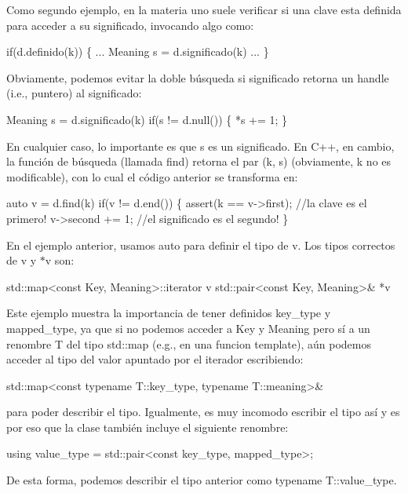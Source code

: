 Como segundo ejemplo, en la materia uno suele verificar si una clave esta definida para acceder a su significado, invocando algo como\+: 
\begin{DoxyCode}
if(d.definido(k)) \{ ... Meaning s = d.significado(k) ... \}
\end{DoxyCode}
 Obviamente, podemos evitar la doble búsqueda si {\ttfamily significado} retorna un handle (i.\+e., puntero) al significado\+: 
\begin{DoxyCode}
Meaning s = d.significado(k)
if(s != d.null()) \{ *s += 1; \}
\end{DoxyCode}
 En cualquier caso, lo importante es que {\ttfamily s} es un significado. En C++, en cambio, la función de búsqueda (llamada {\ttfamily find}) retorna el par {\ttfamily (k, s)} (obviamente, {\ttfamily k} no es modificable), con lo cual el código anterior se transforma en\+: 
\begin{DoxyCode}
\textcolor{keyword}{auto} v = d.find(k)
\textcolor{keywordflow}{if}(v != d.end()) \{
   assert(k == v->first); \textcolor{comment}{//la clave es el primero!}
   v->second += 1;        \textcolor{comment}{//el significado es el segundo!}
\}
\end{DoxyCode}


En el ejemplo anterior, usamos {\ttfamily auto} para definir el tipo de {\ttfamily v}. Los tipos correctos de {\ttfamily v} y {\ttfamily $\ast$v} son\+: 
\begin{DoxyCode}
std::map<const Key, Meaning>::iterator v
std::pair<const Key, Meaning>& *v
\end{DoxyCode}
 Este ejemplo muestra la importancia de tener definidos {\ttfamily key\+\_\+type} y {\ttfamily mapped\+\_\+type}, ya que si no podemos acceder a Key y Meaning pero sí a un renombre T del tipo std\+::map (e.\+g., en una funcion template), aún podemos acceder al tipo del valor apuntado por el iterador escribiendo\+: 
\begin{DoxyCode}
std::map<const typename T::key\_type, typename T::meaning>&
\end{DoxyCode}
 para poder describir el tipo. Igualmente, es muy incomodo escribir el tipo así y es por eso que la clase también incluye el siguiente renombre\+: 
\begin{DoxyCode}
\textcolor{keyword}{using} value\_type = std::pair<const key\_type, mapped\_type>;
\end{DoxyCode}
 De esta forma, podemos describir el tipo anterior como {\ttfamily typename T\+::value\+\_\+type}.

